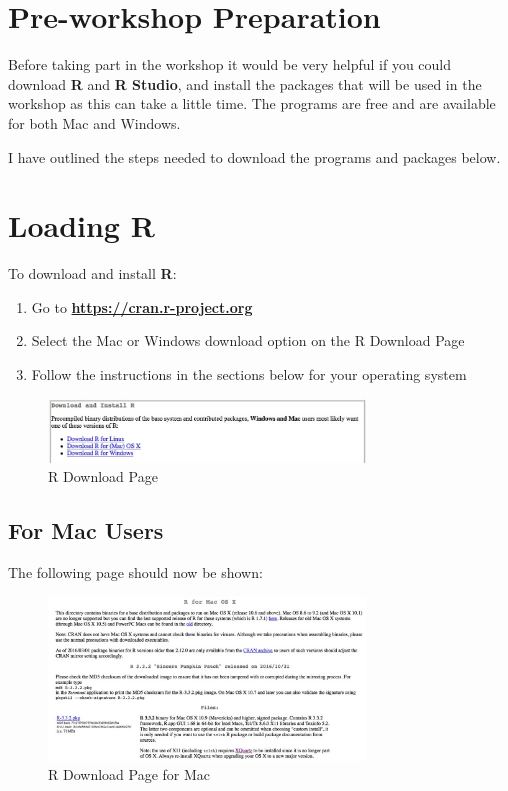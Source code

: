 \documentclass[12pt]{article}
\begin{document}
\sffamily
\setlength{\parindent}{0pt}
\setlength{\parskip}{1em}

\section*{Pre-workshop Preparation}
Before taking part in the workshop it would be very helpful if you could download \textbf{R} and \textbf{R Studio}, and install the packages that will be used in the workshop as this can take a little time. The programs are free and are available for both Mac and Windows. 

I have outlined the steps needed to download the programs and packages below.

\section{Loading R}
To download and install \textbf{R}: 

\begin{enumerate}
	\item Go to \textbf{\url{https://cran.r-project.org}} 
	\item Select the Mac or Windows download option on the R Download Page
	\item Follow the instructions in the sections below for your operating system
\end{enumerate}

\begin{figure}[h]
	\centering
	\includegraphics[width=0.75\textwidth]{downloadR.jpg}
	\caption{R Download Page}
\end{figure}

\subsection*{For Mac Users}
The following page should now be shown:

\begin{figure}[H]
	\centering
	\includegraphics[width=0.75\textwidth]{macR.jpg}
	\caption{R Download Page for Mac}
\end{figure}
\end{document}
